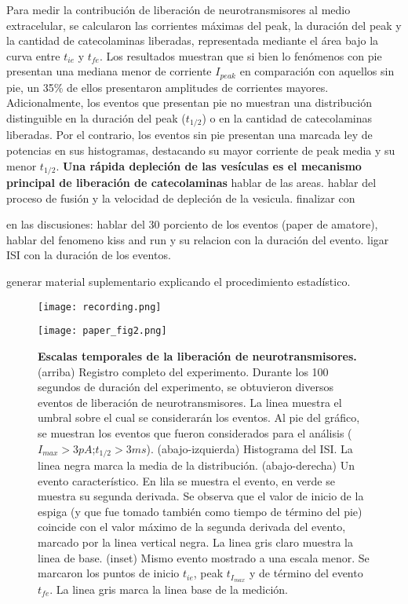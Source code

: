 \documentclass[twocolumn]{article}
\begin{document}
Para medir la contribución de liberación de neurotransmisores al medio extracelular, se calcularon las corrientes máximas del peak, la duración del peak y la cantidad de catecolaminas liberadas, representada mediante el área bajo la curva entre $t_{ie}$ y $t_{fe}$. Los resultados muestran que si bien lo fenómenos con pie presentan una mediana menor de corriente $I_{peak}$ en comparación con aquellos sin pie, un 35\% de ellos presentaron amplitudes de corrientes mayores.  Adicionalmente, los eventos que presentan pie no muestran una distribución distinguible en la duración del peak ($t_{1/2}$) o en la cantidad de catecolaminas liberadas.
Por el contrario, los eventos sin pie presentan una marcada ley de potencias en sus histogramas, destacando su mayor corriente de peak media y su menor $t_{1/2}$.
{\bf Una rápida depleción de las vesículas es el mecanismo principal de liberación de catecolaminas}
hablar de las areas.  hablar del proceso de fusión y la velocidad de depleción de la vesicula.
finalizar con 

en las discusiones: hablar del 30 porciento de los eventos (paper de amatore), hablar del fenomeno kiss and run y su relacion con la duración del evento. ligar ISI con la duración de los eventos.

generar material suplementario explicando el procedimiento estadístico.


\begin{figure*}[h!]
\centering
\texttt{[image: recording.png]} 
\end{figure*}
\begin{figure*}[h!]
\centering
\texttt{[image: paper\_fig2.png]} 
\caption{{\bf Escalas temporales de la liberación de neurotransmisores.} (arriba) Registro completo del experimento. Durante los 100 segundos de duración del experimento, se obtuvieron diversos eventos de liberación de neurotransmisores.  La linea muestra el umbral sobre el cual se considerarán los eventos.  Al pie del gráfico, se muestran los eventos que fueron considerados para el análisis ($I_{max}>3pA$;$t_{1/2}>3ms$).
(abajo-izquierda) Histograma del ISI. La linea negra marca la media de la distribución. (abajo-derecha) Un evento característico.  En lila se muestra el evento, en verde se muestra su segunda derivada.  Se observa que el valor de inicio de la espiga (y que fue tomado también como tiempo de término del pie) coincide con el valor máximo de la segunda derivada del evento, marcado por la linea vertical negra.  La linea gris claro muestra la linea de base. (inset) Mismo evento mostrado a una escala menor.  Se marcaron los puntos de inicio $t_{ie}$, peak $t_{I_{max}}$ y de término del evento $t_{fe}$. La linea gris marca la linea base de la medición.}    
\label{fig:figura1}
\end{figure*}
\end{document}

